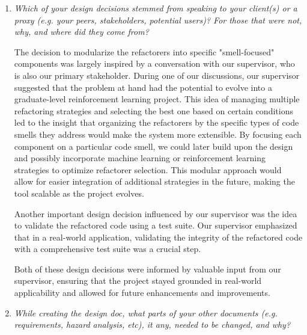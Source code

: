 \documentclass[12pt, titlepage]{article}
\begin{document}
\begin{enumerate}
  \item \textit{Which of your design decisions stemmed from speaking to your client(s)
  or a proxy (e.g. your peers, stakeholders, potential users)? For those that
  were not, why, and where did they come from?}

  The decision to modularize the refactorers into specific "smell-focused" 
  components was largely inspired by a conversation with our supervisor, 
  who is also our primary stakeholder. During one of our discussions, our 
  supervisor suggested that the problem at hand had the potential to 
  evolve into a graduate-level reinforcement learning project. This 
  idea of managing multiple refactoring strategies and selecting the 
  best one based on certain conditions led to the insight that 
  organizing the refactorers by the specific types of code smells 
  they address would make the system more extensible. By focusing 
  each component on a particular code smell, we could later build 
  upon the design and possibly incorporate machine learning or 
  reinforcement learning strategies to optimize refactorer selection. 
  This modular approach would allow for easier integration of additional 
  strategies in the future, making the tool scalable as the project evolves.


  Another important design decision influenced by our supervisor was the 
  idea to validate the refactored code using a test suite. Our supervisor 
  emphasized that in a real-world application, validating the integrity 
  of the refactored code with a comprehensive test suite was a crucial step. 

  Both of these design decisions were informed by valuable input from our 
  supervisor, ensuring that the project stayed grounded in real-world 
  applicability and allowed for future enhancements and improvements.


  \item \textit{While creating the design doc, what parts of your other documents (e.g.
  requirements, hazard analysis, etc), it any, needed to be changed, and why?}
  

\end{enumerate}
\end{document}
